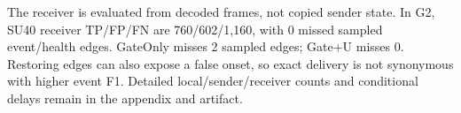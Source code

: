 The receiver is evaluated from decoded frames, not copied sender state. In G2, SU40 receiver TP/FP/FN are 760/602/1,160, with 0 missed sampled event/health edges. GateOnly misses 2 sampled edges; Gate+U misses 0. Restoring edges can also expose a false onset, so exact delivery is not synonymous with higher event F1. Detailed local/sender/receiver counts and conditional delays remain in the appendix and artifact.
